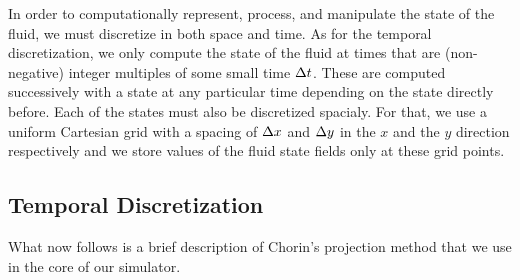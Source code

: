 \documentclass[11pt,a4paper,twoside,openright]{report}
\begin{document}
In order to computationally represent, process, and manipulate the state of the fluid, we must discretize in both space and time. As for the temporal discretization, we only compute the state of the fluid at times that are (non-negative) integer multiples of some small time $\Delta t$. These are computed successively with a state at any particular time depending on the state directly before. Each of the states must also be discretized spacialy. For that, we use a uniform Cartesian grid with a spacing of $\Delta x$ and $\Delta y$ in the $x$ and the $y$ direction respectively and we store values of the fluid state fields only at these grid points.

\subsection{Temporal Discretization}
What now follows is a brief description of Chorin's projection method that we use in the core of our simulator.
\end{document}
